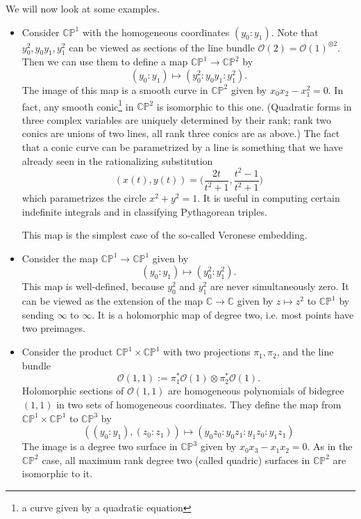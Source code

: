 \documentclass[11pt]{article}
\numberwithin{equation}{section}
\numberwithin{footnote}{section}
\newcommand{\blue}{\color{blue}}
\renewcommand{\P}{{\mathbb P}}
\newcommand{\C}{{\mathbb C}}
\newcommand{\CP}{{\mathbb C \mathbb P}}
\begin{document}
\smallskip
We will now look at some examples.
\begin{itemize}
\item
Consider $\C\P^1$ with the homogeneous coordinates $(y_0:y_1)$. Note that $y_0^2,y_0y_1,y_1^2$ can be viewed as sections of the line bundle $\mathcal O(2) = \mathcal O(1)^{\otimes 2}$. Then we can use them to define a map
$\C\P^1 \to \C\P^2$ by
\begin{equation}\label{conic}
(y_0:y_1)\mapsto (y_0^2 :y_0y_1:y_1^2).
\end{equation}
The image of this map is a smooth curve in $\C\P^2$ given by $x_0 x_2 - x_1^2 = 0$. In fact, any smooth conic\footnote{ a curve given by a quadratic equation} in $\C\P^2$ is isomorphic to this one. (Quadratic forms in three complex variables are uniquely determined by their rank; rank two conics are unions of two lines, all rank three conics are as above.) The fact that a conic curve can be parametrized by a line is something that we have already seen in the rationalizing substitution
$$
(x(t),y(t))=\Big(\frac  {2t}{t^2+1}, \frac {t^2-1}{t^2+1} \Big)
$$
which parametrizes the circle $x^2+y^2=1$. It is useful in computing certain indefinite integrals and in classifying Pythagorean triples.

This map is the simplest case of the so-called Veronese embedding.

\item Consider the map $\CP^1\to \CP^1$ given by
$$
(y_0:y_1)\mapsto (y_0^2:y_1^2).
$$
This map is well-defined, because $y_0^2$ and $y_1^2$ are never simultaneously zero. It can be viewed as the extension of the map $\C\to \C$ given by $z\mapsto z^2$ to $\C\P^1$ by sending $\infty$ to $\infty$. It is a holomorphic map of degree two, i.e. most points have two preimages. 

\item
Consider the product $\C\P^1\times \C\P^1$ with two projections $\pi_1,\pi_2$, and the line bundle
$$
\mathcal O(1,1):=\pi_1^*\mathcal O(1) \otimes\pi_2^*\mathcal O(1).
$$
Holomorphic sections of $\mathcal O(1,1)$  are homogeneous polynomials of bidegree $(1,1)$ in two sets of homogeneous coordinates. They define the map from $\C\P^1\times \C\P^1$ to $\C\P^3$  by
\begin{equation}\label{quadric}
((y_0:y_1),(z_0:z_1))\mapsto
(y_0 z_0: y_0z_1:y_1z_0:y_1z_1)
\end{equation}
The image is a degree two surface in $\C\P^3$ given by $x_0x_3-x_1x_2=0$. As in the $\C\P^2$ case, all maximum rank degree two (called {\blue quadric}) surfaces in $\C\P^2$ are isomorphic to it. 


\end{itemize}
\end{document}
